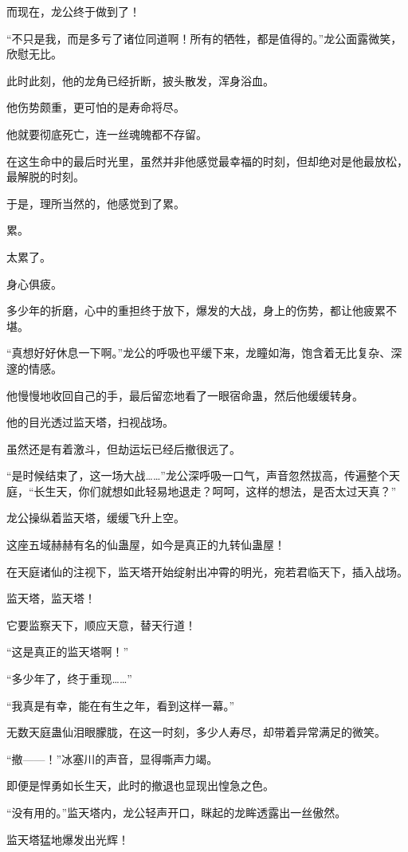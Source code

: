 \begin{this_body}
而现在，龙公终于做到了！

“不只是我，而是多亏了诸位同道啊！所有的牺牲，都是值得的。”龙公面露微笑，欣慰无比。

此时此刻，他的龙角已经折断，披头散发，浑身浴血。

他伤势颇重，更可怕的是寿命将尽。

他就要彻底死亡，连一丝魂魄都不存留。

在这生命中的最后时光里，虽然并非他感觉最幸福的时刻，但却绝对是他最放松，最解脱的时刻。

于是，理所当然的，他感觉到了累。

累。

太累了。

身心俱疲。

多少年的折磨，心中的重担终于放下，爆发的大战，身上的伤势，都让他疲累不堪。

“真想好好休息一下啊。”龙公的呼吸也平缓下来，龙瞳如海，饱含着无比复杂、深邃的情感。

他慢慢地收回自己的手，最后留恋地看了一眼宿命蛊，然后他缓缓转身。

他的目光透过监天塔，扫视战场。

虽然还是有着激斗，但劫运坛已经后撤很远了。

“是时候结束了，这一场大战……”龙公深呼吸一口气，声音忽然拔高，传遍整个天庭，“长生天，你们就想如此轻易地退走？呵呵，这样的想法，是否太过天真？”

龙公操纵着监天塔，缓缓飞升上空。

这座五域赫赫有名的仙蛊屋，如今是真正的九转仙蛊屋！

在天庭诸仙的注视下，监天塔开始绽射出冲霄的明光，宛若君临天下，插入战场。

监天塔，监天塔！

它要监察天下，顺应天意，替天行道！

“这是真正的监天塔啊！”

“多少年了，终于重现……”

“我真是有幸，能在有生之年，看到这样一幕。”

无数天庭蛊仙泪眼朦胧，在这一时刻，多少人寿尽，却带着异常满足的微笑。

“撤——！”冰塞川的声音，显得嘶声力竭。

即便是悍勇如长生天，此时的撤退也显现出惶急之色。

“没有用的。”监天塔内，龙公轻声开口，眯起的龙眸透露出一丝傲然。

监天塔猛地爆发出光辉！


\end{this_body}
